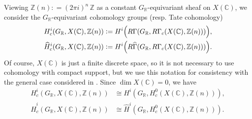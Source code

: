 \documentclass{article}
\newcommand{\CC}{\mathbb{C}}
\newcommand{\RR}{\mathbb{R}}
\newcommand{\ZZ}{\mathbb{Z}}
\newcommand{\dfn}{\mathrel{\mathop:}=}
\theoremstyle{myplain}
\theoremstyle{mydefinition}
\begin{document}
Viewing $\ZZ (n) \dfn (2\pi i)^n\,\ZZ$ as a constant $G_\RR$-equivariant sheaf
on $X(\CC)$, we consider the $G_\RR$-equivariant cohomology groups (resp. Tate
cohomology)
\begin{align*}
  H^i_c (G_\RR, X(\CC), \ZZ(n)) & \dfn H^i \Bigl(R\Gamma (G_\RR, R\Gamma_c (X(\CC), \ZZ(n)))\Bigr), \\
  \widehat{H}^i_c (G_\RR, X(\CC), \ZZ(n)) & \dfn H^i \Bigl(R\widehat{\Gamma} (G_\RR, R\Gamma_c (X(\CC), \ZZ(n)))\Bigr).
\end{align*}
Of course, $X(\CC)$ is just a finite discrete space, so it is not necessary to
use cohomology with compact support, but we use this notation for consistency
with the general case considered in \cite{Beshenov-Weil-etale-1}. Since
$\dim X(\CC) = 0$, we have
\begin{align*}
  H^i_c (G_\RR, X(\CC), \ZZ(n)) & \cong H^i (G_\RR, H^0_c (X(\CC), \ZZ(n))), \\
  \widehat{H}^i_c (G_\RR, X(\CC), \ZZ(n)) & \cong \widehat{H}^i (G_\RR, H^0_c (X(\CC), \ZZ(n))).
\end{align*}
\end{document}
